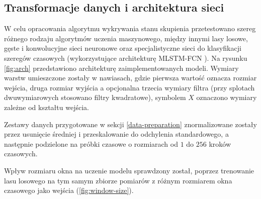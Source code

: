 \documentclass{./assets/wfis}
\begin{document}
\subsection{Transformacje danych i architektura sieci}
W celu opracowania algorytmu wykrywania stanu skupienia przetestowano szereg różnego rodzaju algorytmów uczenia maszynowego, między innymi lasy losowe, gęste i konwolucyjne sieci neuronowe oraz specjalistyczne sieci do klasyfikacji szeregów czasowych (wykorzystujące architekturę MLSTM-FCN \cite{karim_multivariate_2019}). Na rysunku \ref{fig:arch} przedstawiono architekturę zaimplementowanych modeli. Wymiary warstw umieszczone zostały w nawiasach, gdzie pierwsza wartość oznacza rozmiar wejścia, druga rozmiar wyjścia a opcjonalna trzecia wymiary filtra (przy splotach dwuwymiarowych stosowano filtry kwadratowe), symbolem $X$ oznaczono wymiary zależne od kształtu wejścia.

Zestawy danych przygotowane w sekcji \ref{data-preparation} znormalizowane zostały przez usunięcie średniej i przeskalowanie do odchylenia standardowego, a następnie podzielone na próbki czasowe o rozmiarach od $1$ do $256$ kroków czasowych.

Wpływ rozmiaru okna na uczenie modelu sprawdzony został, poprzez trenowanie lasu losowego na tym samym zbiorze pomiarów z różnym rozmiarem okna czasowego jako wejścia (\autoref{fig:window-size}).
\end{document}
